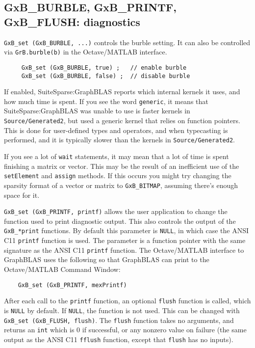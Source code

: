 \documentclass[12pt]{article}
\begin{document}
{\subsection{{\sf GxB\_BURBLE}, {\sf GxB\_PRINTF}, {\sf GxB\_FLUSH}: diagnostics}

\verb'GxB_set (GxB_BURBLE, ...)' controls the burble setting.  It can also be
controlled via \verb'GrB.burble(b)' in the Octave/MATLAB interface.

{\footnotesize
\begin{verbatim}
     GxB_set (GxB_BURBLE, true) ;   // enable burble
     GxB_set (GxB_BURBLE, false) ;  // disable burble \end{verbatim}}

If enabled, SuiteSparse:GraphBLAS reports which internal kernels it uses, and
how much time is spent.  If you see the word \verb'generic', it means that
SuiteSparse:GraphBLAS was unable to use is faster kernels in
\verb'Source/Generated2', but used a generic kernel that relies on function
pointers.  This is done for user-defined types and operators, and when
typecasting is performed, and it is typically slower than the kernels in
\verb'Source/Generated2'.

If you see a lot of \verb'wait' statements, it may mean that a lot of time is
spent finishing a matrix or vector.  This may be the result of an inefficient
use of the \verb'setElement' and \verb'assign' methods.  If this occurs you
might try changing the sparsity format of a vector or matrix to
\verb'GxB_BITMAP', assuming there's enough space for it.

\verb'GxB_set (GxB_PRINTF, printf)' allows the user application to change the
function used to print diagnostic output.  This also controls the output of the
\verb'GxB_*print' functions.  By default this parameter is \verb'NULL', in
which case the ANSI C11 \verb'printf' function is used.  The parameter is a
function pointer with the same signature as the ANSI C11 \verb'printf'
function.  The Octave/MATLAB interface to GraphBLAS uses the following so that
GraphBLAS can print to the Octave/MATLAB Command Window:

{\footnotesize
\begin{verbatim}
    GxB_set (GxB_PRINTF, mexPrintf) \end{verbatim}}

After each call to the \verb'printf' function, an optional
\verb'flush' function is called, which is \verb'NULL' by default.  If
\verb'NULL', the function is not used.  This can be changed with
\verb'GxB_set (GxB_FLUSH, flush)'.  The \verb'flush' function takes no
arguments, and returns an \verb'int' which is 0 if successful, or any nonzero
value on failure (the same output as the ANSI C11 \verb'fflush' function,
except that \verb'flush' has no inputs).

}
\end{document}
